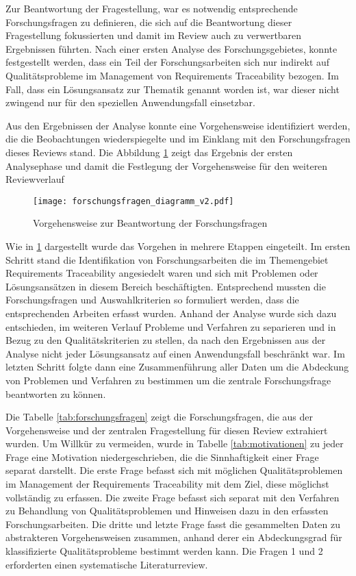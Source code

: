 Zur Beantwortung der Fragestellung, war es notwendig entsprechende Forschungsfragen zu definieren, die sich auf die Beantwortung dieser Fragestellung fokussierten und damit im Review auch zu verwertbaren Ergebnissen führten. Nach einer ersten Analyse des Forschungsgebietes, konnte festgestellt werden, dass ein Teil der Forschungsarbeiten sich nur indirekt auf Qualitätsprobleme im Management von Requirements Traceability bezogen. Im Fall, dass ein Lösungsansatz zur Thematik genannt worden ist, war dieser nicht zwingend nur für den speziellen Anwendungsfall einsetzbar.

Aus den Ergebnissen der Analyse konnte eine Vorgehensweise identifiziert werden, die die Beobachtungen wiederspiegelte und im Einklang mit den Forschungsfragen dieses Reviews stand. Die Abbildung \ref{fig:abb_forschungsfragen} zeigt das Ergebnis der ersten Analysephase und damit die Festlegung der Vorgehensweise für den weiteren Reviewverlauf

\begin{figure}[!htb]
  \centering
  \texttt{[image: forschungsfragen\_diagramm\_v2.pdf]}
  \caption{Vorgehensweise zur Beantwortung der Forschungsfragen}
  \label{fig:abb_forschungsfragen}
\end{figure}

Wie in \ref{fig:abb_forschungsfragen} dargestellt wurde das Vorgehen in mehrere Etappen eingeteilt. Im ersten Schritt stand die Identifikation von Forschungsarbeiten die im Themengebiet Requirements Traceability angesiedelt waren und sich mit Problemen oder Lösungsansätzen in diesem Bereich beschäftigten. Entsprechend mussten die Forschungsfragen und Auswahlkriterien so formuliert werden, dass die entsprechenden Arbeiten erfasst wurden. Anhand der Analyse wurde sich dazu entschieden, im weiteren Verlauf Probleme und Verfahren zu separieren und in Bezug zu den Qualitätskriterien zu stellen, da nach den Ergebnissen aus der Analyse nicht jeder Lösungsansatz auf einen Anwendungsfall beschränkt war. Im letzten Schritt folgte dann eine Zusammenführung aller Daten um die Abdeckung von Problemen und Verfahren zu bestimmen um die zentrale Forschungsfrage beantworten zu können.

Die Tabelle \ref{tab:forschungsfragen} zeigt die Forschungsfragen, die aus der Vorgehensweise und der zentralen Fragestellung für diesen Review extrahiert wurden. Um Willkür zu vermeiden, wurde in Tabelle \ref{tab:motivationen} zu jeder Frage eine Motivation niedergeschrieben, die die Sinnhaftigkeit einer Frage separat darstellt. Die erste Frage befasst sich mit möglichen Qualitätsproblemen im Management der Requirements Traceability mit dem Ziel, diese möglichst vollständig zu erfassen. Die zweite Frage befasst sich separat mit den Verfahren zu Behandlung von Qualitätsproblemen und Hinweisen dazu in den erfassten Forschungsarbeiten. Die dritte und letzte Frage fasst die gesammelten Daten zu abstrakteren Vorgehensweisen zusammen, anhand derer ein Abdeckungsgrad für klassifizierte Qualitätsprobleme bestimmt werden kann. Die Fragen 1 und 2 erforderten einen systematische Literaturreview.

